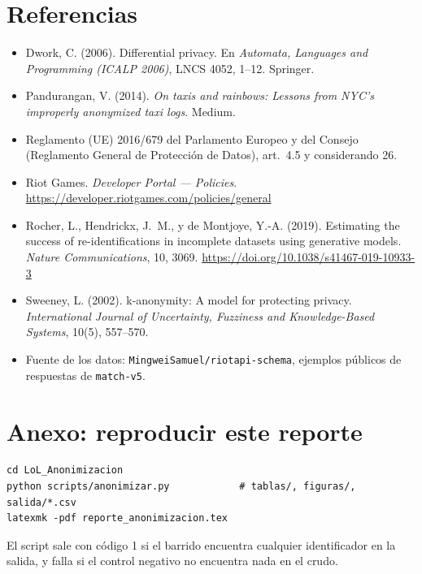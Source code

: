 \documentclass[11pt,letterpaper]{article}
\begin{document}
\section*{Referencias}
\begin{itemize}[leftmargin=1.4em,itemsep=.3em,label={}]
  \item Dwork, C. (2006). Differential privacy. En \emph{Automata, Languages and
        Programming (ICALP 2006)}, LNCS 4052, 1--12. Springer.
  \item Pandurangan, V. (2014). \emph{On taxis and rainbows: Lessons from NYC's
        improperly anonymized taxi logs}. Medium.
  \item Reglamento (UE) 2016/679 del Parlamento Europeo y del Consejo (Reglamento
        General de Protección de Datos), art.~4.5 y considerando 26.
  \item Riot Games. \emph{Developer Portal — Policies}.
        \url{https://developer.riotgames.com/policies/general}
  \item Rocher, L., Hendrickx, J.~M., y de Montjoye, Y.-A. (2019). Estimating the
        success of re-identifications in incomplete datasets using generative
        models. \emph{Nature Communications}, 10, 3069.
        \url{https://doi.org/10.1038/s41467-019-10933-3}
  \item Sweeney, L. (2002). k-anonymity: A model for protecting privacy.
        \emph{International Journal of Uncertainty, Fuzziness and Knowledge-Based
        Systems}, 10(5), 557--570.
  \item Fuente de los datos: \texttt{MingweiSamuel/riotapi-schema}, ejemplos
        públicos de respuestas de \texttt{match-v5}.
\end{itemize}

\section*{Anexo: reproducir este reporte}
\begin{verbatim}
cd LoL_Anonimizacion
python scripts/anonimizar.py            # tablas/, figuras/, salida/*.csv
latexmk -pdf reporte_anonimizacion.tex
\end{verbatim}
\noindent El script sale con código 1 si el barrido encuentra cualquier identificador
en la salida, y falla si el control negativo no encuentra nada en el crudo.

\vspace{.5cm}
\end{document}
